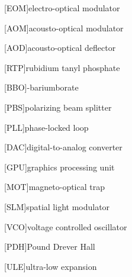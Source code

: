 [EOM]{electro-optical modulator}

[AOM]{acousto-optical modulator}

[AOD]{acousto-optical deflector}

[RTP]{rubidium tanyl phosphate}

[BBO]{\textbeta-bariumborate}

[PBS]{polarizing beam splitter}

[PLL]{phase-locked loop}

[DAC]{digital-to-analog converter}

[GPU]{graphics processing unit}

[MOT]{magneto-optical trap}

[SLM]{spatial light modulator}

[VCO]{voltage controlled oscillator}

[PDH]{Pound Drever Hall}

[ULE]{ultra-low expansion}
